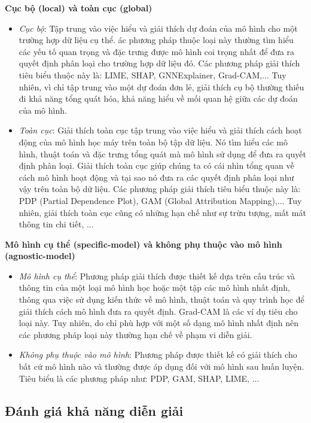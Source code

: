 \bigbreak\noindent
\textbf{Cục bộ (local) và toàn cục (global)}
\begin{itemize}
    \item \textit{Cục bộ}: Tập trung vào việc hiểu và giải thích dự đoán của mô hình cho một trường hợp dữ liệu cụ thể. ác phương pháp thuộc loại này thường tìm hiểu các yếu tố quan trọng và đặc trưng được mô hình coi trọng nhất để đưa ra quyết định phân loại cho trường hợp dữ liệu đó. Các phương pháp giải thích tiêu biểu thuộc này là: LIME, SHAP, GNNExplainer, Grad-CAM,... Tuy nhiên, vì chỉ tập trung vào một dự đoán đơn lẻ, giải thích cụ bộ thường thiếu đi khả năng tổng quát hóa, khả năng hiểu về mối quan hệ giữa các dự đoán của mô hình.
    \item \textit{Toàn cục}: Giải thích toàn cục tập trung vào việc hiểu và giải thích cách hoạt động của mô hình học máy trên toàn bộ tập dữ liệu. Nó tìm hiểu các mô hình, thuật toán và đặc trưng tổng quát mà mô hình sử dụng để đưa ra quyết định phân loại. Giải thích toàn cục giúp chúng ta có cái nhìn tổng quan về cách mô hình hoạt động và tại sao nó đưa ra các quyết định phân loại như vậy trên toàn bộ dữ liệu. Các phương pháp giải thích tiêu biểu thuộc này là: PDP \cite{greenwell2017pdp} (Partial Dependence Plot), GAM \cite{ibrahim2019global} (Global Attribution Mapping),... Tuy nhiên, giải thích toàn cục cũng có những hạn chế như sự trừu tượng, mất mát thông tin chi tiết, ...
\end{itemize}

\bigbreak\noindent
\textbf{Mô hình cụ thể (specific-model) và không phụ thuộc vào mô hình (agnostic-model)}
\begin{itemize}
    \item \textit{Mô hình cụ thể}: Phương pháp giải thích được thiết kế dựa trên cấu trúc và thông tin của một loại mô hình học hoặc một tập các mô hình nhất định, thông qua việc sử dụng kiến thức về mô hình, thuật toán và quy trình học để giải thích cách mô hình đưa ra quyết định. Grad-CAM là các ví dụ tiêu cho loại này. Tuy nhiên, do chỉ phù hợp với một số dạng mô hình nhất định nên các phương pháp loại này thường hạn chế về phạm vi diễn giải.
    \item \textit{Không phụ thuộc vào mô hình}: Phương pháp được thiết kế có giải thích cho bất cứ mô hình nào và thường được áp dụng đối với mô hình sau huấn luyện. Tiêu biểu là các phương pháp như: PDP, GAM, SHAP, LIME, ...
\end{itemize}

\subsection{Đánh giá khả năng diễn giải} \label{sec:interpretability-metric}

